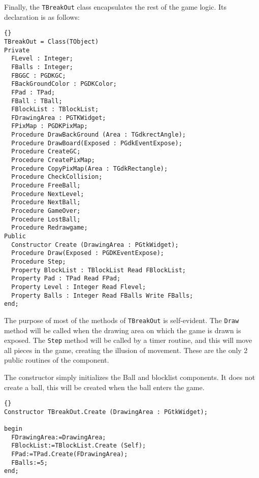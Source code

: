 \documentclass[10pt]{article}
\newcommand{\var}[1]{\texttt{#1}}
\begin{document}
Finally, the \var{TBreakOut} class encapsulates the rest of the game logic. Its declaration 
is as follows:
\begin{lstlisting}{}
TBreakOut = Class(TObject)
Private
  FLevel : Integer;
  FBalls : Integer;
  FBGGC : PGDKGC;
  FBackGroundColor : PGDKColor;
  FPad : TPad;
  FBall : TBall;
  FBlockList : TBlockList;
  FDrawingArea : PGTKWidget;
  FPixMap : PGDKPixMap;
  Procedure DrawBackGround (Area : TGdkrectAngle);
  Procedure DrawBoard(Exposed : PGdkEventExpose);
  Procedure CreateGC;
  Procedure CreatePixMap;
  Procedure CopyPixMap(Area : TGdkRectangle);
  Procedure CheckCollision;
  Procedure FreeBall;
  Procedure NextLevel;
  Procedure NextBall;
  Procedure GameOver;
  Procedure LostBall;
  Procedure Redrawgame;
Public   
  Constructor Create (DrawingArea : PGtkWidget);
  Procedure Draw(Exposed : PGDKEventExpose);
  Procedure Step;
  Property BlockList : TBlockList Read FBlockList;
  Property Pad : TPad Read FPad;
  Property Level : Integer Read Flevel;
  Property Balls : Integer Read FBalls Write FBalls;
end;
\end{lstlisting}
The purpose of most of the methods of \var{TBreakOut} is self-evident. The \var{Draw}
method will be called when the drawing area on which the game is drawn is exposed.
The \var{Step} method will be called by a timer routine, and this will move all pieces
in the game, creating the illusion of movement. These are the only 2 public routines
of the component.

The constructor simply initializes the Ball and blocklist components. It does not
create a ball, this will be created when the ball enters the game.
\begin{lstlisting}{}
Constructor TBreakOut.Create (DrawingArea : PGtkWidget);

begin
  FDrawingArea:=DrawingArea;
  FBlockList:=TBlockList.Create (Self);
  FPad:=TPad.Create(FDrawingArea);
  FBalls:=5;
end;
\end{lstlisting}
\end{document}
